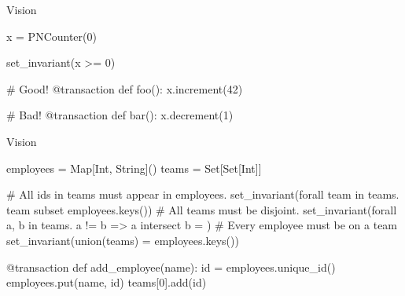 \documentclass[xcolor={dvipsnames,svgnames,table}]{beamer}
\begin{document}
\begin{frame}{\iconfluence{}}
  \begin{center}
  \end{center}
\end{frame}

\begin{frame}[fragile]{Vision}
  \begin{center}
    \begin{Python}[gobble=6]
      x = PNCounter(0)

      set_invariant(x >= 0)

      # Good!
      @transaction
      def foo():
        x.increment(42)

      # Bad!
      @transaction
      def bar():
        x.decrement(1)
    \end{Python}
  \end{center}
\end{frame}

\begin{frame}[fragile]{Vision}
  \begin{center}
    \begin{Python}[gobble=6]
      employees = Map[Int, String]()
      teams = Set[Set[Int]]

      # All ids in teams must appear in employees.
      set_invariant(forall team in teams.
        team subset employees.keys())
      # All teams must be disjoint.
      set_invariant(forall a, b in teams.
        a != b => a intersect b = {})
      # Every employee must be on a team
      set_invariant(union(teams) = employees.keys())

      @transaction
      def add_employee(name):
        id = employees.unique_id()
        employees.put(name, id)
        teams[0].add(id)
    \end{Python}
  \end{center}
\end{frame}
\end{document}
